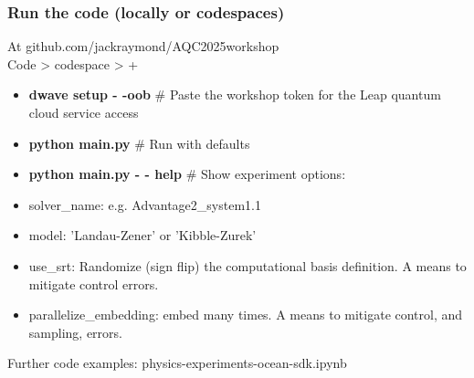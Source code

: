 \documentclass[aspectratio=169,final,11pt,forpublic]{beamer} %
\begin{document}


\begin{frame}\frametitle{\bf Run the code (locally or codespaces)}
  At github.com/jackraymond/AQC2025workshop \\
  Code > codespace > +\\
  \begin{itemize}
    \item[] {\bf dwave setup - -oob}  \# Paste the workshop token for the Leap quantum cloud service access
    \item[] {\bf python main.py}  \# Run with defaults
    \item[] {\bf python main.py - - help}  \# Show experiment options:
  \end{itemize}

  \begin{itemize}
  \item solver\_name: e.g. Advantage2\_system1.1
  \item model: 'Landau-Zener' or 'Kibble-Zurek'
  \item use\_srt: Randomize (sign flip) the computational basis definition. A means to mitigate control errors.
  \item parallelize\_embedding: embed many times. A means to mitigate control, and sampling, errors. 
  \end{itemize}
  Further code examples: physics-experiments-ocean-sdk.ipynb
\end{frame}
  
%
\end{document}
